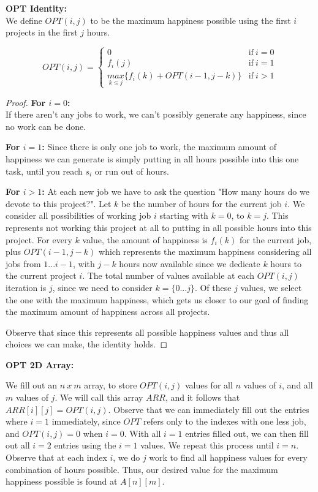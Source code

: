 \documentclass[11pt]{article}
\begin{document}
\textbf{OPT Identity: }\\
We define $OPT(i,j)$ to be the maximum happiness possible using the first $i$ projects in the first $j$ hours.

\begin{equation}
	OPT(i,j) = 
	\begin{cases}
	0 & \text{if} \ i = 0\\
	f_i(j) & \text{if} \ i = 1\\
	\underset{k \leq j}{max} \{f_i(k) + OPT(i-1, j-k)\} & \text{if} \ i > 1
	\end{cases}
\end{equation}

\begin{proof}
\textbf{For $i = 0$:}\\
If there aren't any jobs to work, we can't possibly generate any happiness, since no work can be done.

\textbf{For $i = 1$:}
Since there is only one job to work, the maximum amount of happiness we can generate is simply putting in all hours possible into this one task, until you reach $s_i$ or run out of hours.

\textbf{For $i>1$:}
At each new job we have to ask the question "How many hours do we devote to this project?". Let $k$ be the number of hours for the current job $i$. We consider all possibilities of working job $i$ starting with $k=0$, to $k=j$. This represents not working this project at all to putting in all possible hours into this project. For every $k$ value, the amount of happiness is $f_i(k)$ for the current job, plus $OPT(i-1, j-k)$ which represents the maximum happiness considering all jobs from $1 ... i-1$, with $j-k$ hours now available since we dedicate $k$ hours to the current project $i$. The total number of values available at each $OPT(i, j)$ iteration is $j$, since we need to consider $k = \{0...j\}$. Of these $j$ values, we select the one with the maximum happiness, which gets us closer to our goal of finding the maximum amount of happiness across all projects.

Observe that since this represents all possible happiness values and thus all choices we can make, the identity holds.
\end{proof}

\textbf{OPT 2D Array: }

We fill out an $n\ x\ m$ array, to store $OPT(i,j)$ values for all $n$ values of $i$, and all $m$ values of $j$. We will call this array $ARR$, and it follows that $ARR[i][j] = OPT(i, j)$. Observe that we can immediately fill out the entries where $i = 1$ immediately, since $OPT$ refers only to the indexes with one less job, and $OPT(i, j) = 0$ when $i = 0$. With all $i = 1$ entries filled out, we can then fill out all $i = 2$ entries using the $i = 1$ values. We repeat this process until $i = n$. Observe that at each index $i$, we do $j$ work to find all happiness values for every combination of hours possible. Thus, our desired value for the maximum happiness possible is found at $A[n][m]$.
\end{document}
